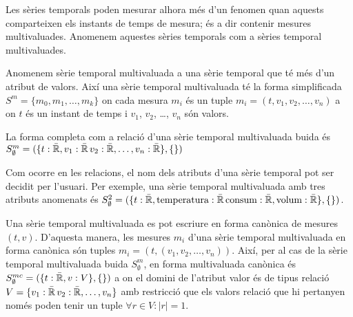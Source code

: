 








Les sèries temporals poden mesurar alhora més d'un fenomen quan
aquests comparteixen els instants de temps de mesura; és a dir
contenir mesures multivaluades.  Anomenem aquestes sèries temporals
com a sèries temporal multivaluades.
\begin{definition}
  Anomenem sèrie temporal multivaluada a una sèrie temporal que té més
  d'un atribut de valors. Així una sèrie temporal multivaluada té la
  forma simplificada $S^m = \{ m_0, m_1 , \dotsc, m_k \}$ on cada mesura
  $m_i$ és un tuple $m_i=(t,v_1,v_2,\dotsc,v_n)$ a on $t$ és un
  instant de temps i $v_1$, $v_2$, \dots, $v_n$ són valors.

  La forma completa com a relació d'una sèrie temporal multivaluada
  buida és $S^m_{\emptyset} = ( \{t: \bar{\mathbb{R}{}}, v_1: \bar{\mathbb{R}{}}\, v_2:
  \bar{\mathbb{R}{}}, \dotsc, v_n: \bar{\mathbb{R}{}}\}, \{ \} )$
\end{definition}

Com ocorre en les relacions, el nom dels atributs d'una sèrie temporal
pot ser decidit per l'usuari. Per exemple, una sèrie temporal
multivaluada amb tres atributs anomenats és $S^2_{\emptyset} = ( \{t:
\bar{\mathbb{R}{}}, \text{temperatura}: \bar{\mathbb{R}{}}\, \text{consum}:
\bar{\mathbb{R}{}}, \text{volum}: \bar{\mathbb{R}{}}\}, \{ \} )$.



Una sèrie temporal multivaluada es pot escriure en forma canònica de
mesures $(t,v)$. D'aquesta manera, les mesures $m_i$
d'una sèrie temporal multivaluada en forma canònica són tuples
$m_i=(t,(v_1,v_2,\dotsc,v_n))$.  Així, per al cas de la sèrie temporal
multivaluada buida $S^m_{\emptyset}$, en forma multivaluada canònica és
$S^{mc}_{\emptyset} = ( \{t: \bar{\mathbb{R}{}}, v: V \}, \{ \} )$ a on el
domini de l'atribut valor és de tipus relació $V = \{ v_1:
\bar{\mathbb{R}{}}\, v_2: \bar{\mathbb{R}{}}, \dotsc, v_n \}$ amb restricció que els
valors relació que hi pertanyen només poden tenir un tuple $\forall r
\in V: |r| = 1$.



